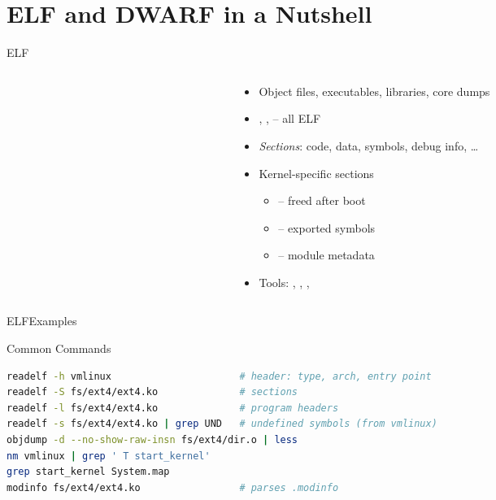 
\section{ELF and DWARF in a Nutshell}
\frame{\sectionpage}

\begin{frame}{ELF}

  \begin{columns}[c]
    \begin{column}{.35\textwidth}
      
    \end{column}
    \begin{column}{.6\textwidth}
      \begin{itemize}[<+->]
	\item Object files, executables, libraries, core dumps
	\item {}, ,  -- all ELF
	\item \emph{Sections}: code, data, symbols, debug info, \dots
	\item Kernel-specific sections
	  \begin{itemize}[<.->]
	    \item {} -- freed after boot
	    \item {} -- exported symbols
	    \item {} -- module metadata
	  \end{itemize}
	\item Tools: , , , 
      \end{itemize}
    \end{column}
  \end{columns}

\end{frame}

\begin{frame}[fragile]{ELF}{Examples}

  \begin{block}{Common Commands}
  \begin{lstlisting}[language=bash]
readelf -h vmlinux                      # header: type, arch, entry point
readelf -S fs/ext4/ext4.ko              # sections
readelf -l fs/ext4/ext4.ko              # program headers
readelf -s fs/ext4/ext4.ko | grep UND   # undefined symbols (from vmlinux)
objdump -d --no-show-raw-insn fs/ext4/dir.o | less
nm vmlinux | grep ' T start_kernel'
grep start_kernel System.map
modinfo fs/ext4/ext4.ko                 # parses .modinfo
  \end{lstlisting}
  \end{block}

\end{frame}

